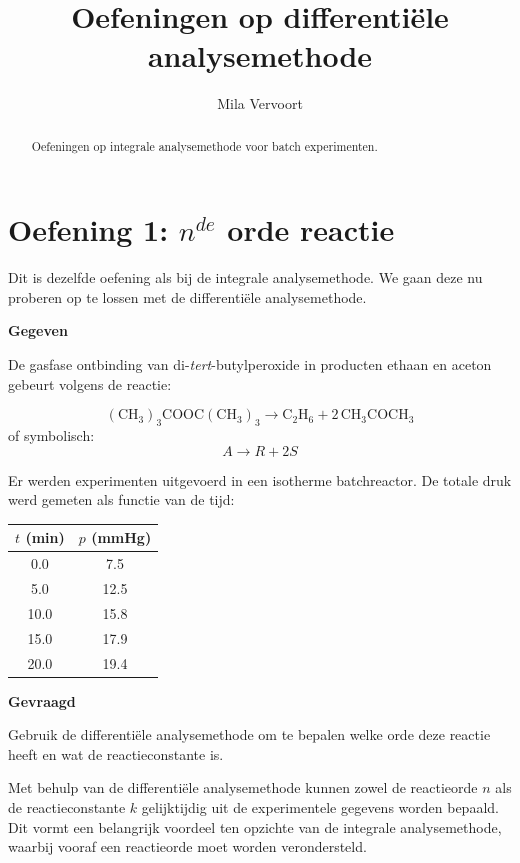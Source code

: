 \documentclass{ximera}
\title{Oefeningen op differentiële analysemethode}
\author{Mila Vervoort}
\begin{document}
\begin{abstract}
    Oefeningen op integrale analysemethode voor batch experimenten.
\end{abstract}
\maketitle
\label{xim:oefeningen differentiële analysemethode}

\section*{Oefening 1: $n^{de}$ orde reactie}

Dit is dezelfde oefening als bij de integrale analysemethode. We gaan deze nu proberen op te lossen met de differentiële analysemethode.

\textbf{Gegeven}

De gasfase ontbinding van di-\textit{tert}-butylperoxide in producten ethaan en aceton gebeurt volgens de reactie:

\[
(\mathrm{CH}_3)_3\mathrm{COOC}(\mathrm{CH}_3)_3 \rightarrow \mathrm{C}_2\mathrm{H}_6 + 2\,\mathrm{CH}_3\mathrm{COCH}_3
\]
of symbolisch:
\[
A \rightarrow R + 2S
\]

Er werden experimenten uitgevoerd in een isotherme batchreactor. De totale druk werd gemeten als functie van de tijd:

\begin{center}
\begin{tabular}{c|c}
$t$ (min) & $p$ (mmHg) \\
\hline
0.0 & 7.5 \\
5.0 & 12.5 \\
10.0 & 15.8 \\
15.0 & 17.9 \\
20.0 & 19.4 \\
\end{tabular}
\end{center}

\textbf{Gevraagd}

Gebruik de differentiële analysemethode om te bepalen welke orde deze reactie heeft en wat de reactieconstante is. \\

\begin{remark} \text{  }

Met behulp van de differentiële analysemethode kunnen zowel de reactieorde $n$ als de reactieconstante $k$ gelijktijdig uit de experimentele gegevens worden bepaald. Dit vormt een belangrijk voordeel ten opzichte van de integrale analysemethode, waarbij vooraf een reactieorde moet worden verondersteld.
\end{remark}
\end{document}
